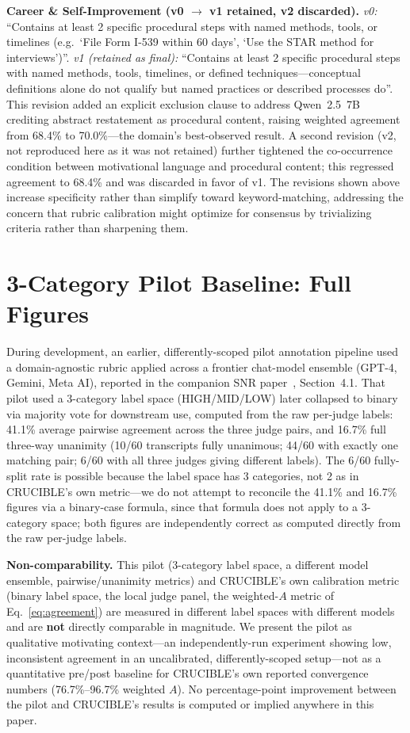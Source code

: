 \documentclass[11pt]{article}
\begin{document}
\textbf{Career \& Self-Improvement (v0 $\to$ v1 retained, v2 discarded).}
\textit{v0:} ``Contains at least 2 specific procedural steps with named
methods, tools, or timelines (e.g.\ `File Form I-539 within 60 days', `Use
the STAR method for interviews')''.
\textit{v1 (retained as final):} ``Contains at least 2 specific procedural
steps with named methods, tools, timelines, or defined techniques---conceptual
definitions alone do not qualify but named practices or described processes
do''. This revision added an explicit exclusion clause to address
Qwen~2.5~7B crediting abstract restatement as procedural content, raising
weighted agreement from 68.4\% to 70.0\%---the domain's best-observed
result. A second revision (v2, not reproduced here as it was not retained)
further tightened the co-occurrence condition between motivational language
and procedural content; this regressed agreement to 68.4\% and was
discarded in favor of v1. The revisions shown above increase specificity
rather than simplify toward keyword-matching, addressing the concern that
rubric calibration might optimize for consensus by trivializing criteria
rather than sharpening them.

\section{3-Category Pilot Baseline: Full Figures}
\label{app:baseline}

During development, an earlier, differently-scoped pilot annotation
pipeline used a domain-agnostic rubric applied across a frontier chat-model
ensemble (GPT-4, Gemini, Meta AI), reported in the companion SNR
paper~\cite{dasSNR2026}, Section~4.1. That pilot used a 3-category label
space (HIGH/MID/LOW) later collapsed to binary via majority vote for
downstream use, computed from the raw per-judge labels: 41.1\% average
pairwise agreement across the three judge pairs, and 16.7\% full three-way
unanimity (10/60 transcripts fully unanimous; 44/60 with exactly one
matching pair; 6/60 with all three judges giving different labels). The
6/60 fully-split rate is possible because the label space has 3 categories,
not 2 as in CRUCIBLE's own metric---we do not attempt to reconcile the
41.1\% and 16.7\% figures via a binary-case formula, since that formula
does not apply to a 3-category space; both figures are independently
correct as computed directly from the raw per-judge labels.

\textbf{Non-comparability.} This pilot (3-category label space, a
different model ensemble, pairwise/unanimity metrics) and CRUCIBLE's own
calibration metric (binary label space, the local judge panel, the
weighted-$A$ metric of Eq.~\ref{eq:agreement}) are measured in different
label spaces with different models and are \textbf{not} directly
comparable in magnitude. We present the pilot as qualitative motivating
context---an independently-run experiment showing low, inconsistent
agreement in an uncalibrated, differently-scoped setup---not as a
quantitative pre/post baseline for CRUCIBLE's own reported convergence
numbers (76.7\%--96.7\% weighted $A$). No percentage-point improvement
between the pilot and CRUCIBLE's results is computed or implied anywhere
in this paper.
\end{document}
